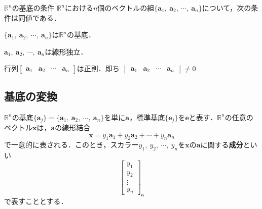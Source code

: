 \begin{kousiki}{$\mathbb{R}^n$の基底の条件}
	$\mathbb{R}^n$における$n$個のベクトルの組$\{\bm{a}_1,\ \bm{a}_2,\ \cdots,\ \bm{a}_n\}$について，次の条件は同値である．
	\begin{enumerate}[label=\textbf{[\arabic*]}, labelsep=10pt, leftmargin=23pt]
		\item $\{\bm{a}_1,\ \bm{a}_2,\ \cdots,\ \bm{a}_n\}$は$\mathbb{R}^n$の基底．
		\item $\bm{a}_1,\ \bm{a}_2,\ \cdots,\ \bm{a}_n$は線形独立．
		\item 行列$
			\begin{bmatrix}
				\bm{a}_1 & \bm{a}_2 & \cdots & \bm{a}_n
			\end{bmatrix}
			$は正則．即ち
			$
			\begin{vmatrix}
				\bm{a}_1 & \bm{a}_2 & \cdots & \bm{a}_n
			\end{vmatrix}
			\ne 0$
	\end{enumerate}
\end{kousiki}



\subsection{基底の変換}

$\mathbb{R}^n$の基底$\{\bm{a}_j\} = \{\bm{a}_1,\ \bm{a}_2,\ \cdots,\ \bm{a}_n\}$を単に$\bm{a}$，標準基底$\{\bm{e}_j\}$を$\bm{e}$と表す．$\mathbb{R}^n$の任意のベクトル$\bm{x}$は，$\bm{a}$の線形結合
\begin{equation}
	\bm{x} = y_1\bm{a}_1 + y_2\bm{a}_2 + \cdots + y_n\bm{a}_n
\end{equation}
で一意的に表される．このとき，スカラー$y_1,\ y_2,\ \cdots,\ y_n$を$\bm{x}$の$\bm{a}$に関する\textbf{成分}といい
\begin{equation}
	\begin{bmatrix}
		y_1\\ y_2\\ \vdots\\ y_n
	\end{bmatrix}_{\bm{a}}
\end{equation}
で表すこととする．